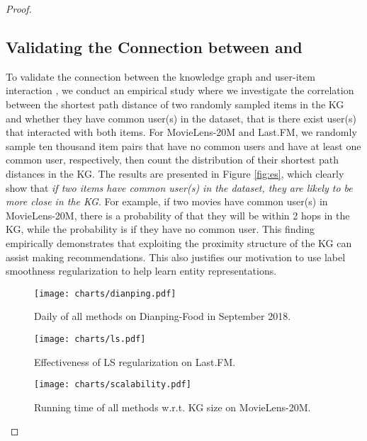 \documentclass[sigconf]{acmart}
\begin{document}
\begin{proof}
		
	\subsection{Validating the Connection between  and }
    	To validate the connection between the knowledge graph  and user-item interaction , we conduct an empirical study where we investigate the correlation between the shortest path distance of two randomly sampled items in the KG and whether they have common user(s) in the dataset, that is there exist user(s) that interacted with both items.
		For MovieLens-20M and Last.FM, we randomly sample ten thousand item pairs that have no common users and have at least one common user, respectively, then count the distribution of their shortest path distances in the KG.
		The results are presented in Figure \ref{fig:es}, which clearly show that \textit{if two items have common user(s) in the dataset, they are likely to be more close in the KG}.
		For example, if two movies have common user(s) in MovieLens-20M, there is a probability of  that they will be within 2 hops in the KG, while the probability is  if they have no common user.
		This finding empirically demonstrates that exploiting the proximity structure of the KG can assist making recommendations.
		This also justifies our motivation to use label smoothness regularization to help learn entity representations.
       	
    		
    		\begin{figure*}
  				\begin{minipage}[t]{0.3\linewidth}    				\centering 
    				\texttt{[image: charts/dianping.pdf]}
    				\vspace{-0.2in}
    				\caption{Daily  of all methods on Dianping-Food in September 2018.} 
    				\label{fig:food} 
  				\end{minipage}
  				\hfill
  				\begin{minipage}[t]{0.3\linewidth} 
    				\centering 
    				\texttt{[image: charts/ls.pdf]}
    				\vspace{-0.2in}
    				\caption{Effectiveness of LS regularization on Last.FM.} 
    				\label{fig:ls} 
  				\end{minipage}
  				\hfill
  				\begin{minipage}[t]{0.315\linewidth} 
    				\centering 
    				\texttt{[image: charts/scalability.pdf]}
    				\vspace{-0.2in}
    				\caption{Running time of all methods w.r.t. KG size on MovieLens-20M.} 
    				\label{fig:scalability} 
  				\end{minipage} 
			\end{figure*}
		

\end{proof}
\end{document}
